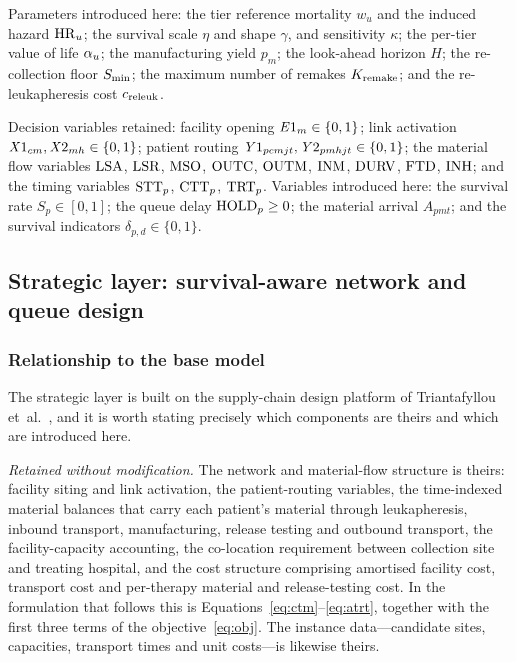 Parameters introduced here: the tier reference mortality $w_u$ and the induced
hazard $\mathrm{HR}_u$; the survival scale $\eta$ and shape $\gamma$, and sensitivity
$\kappa$; the per-tier value of life $\alpha_{u}$; the manufacturing yield
$p_m$; the look-ahead horizon $H$; the re-collection floor $S_{\min}$; the
maximum number of remakes $K_{\mathrm{remake}}$; and the re-leukapheresis cost $c_{\mathrm{releuk}}$.

Decision variables retained: facility opening $\mathit{E}1_m \in \{0,1\}$; link
activation $\mathit{X}1_{cm}, \mathit{X}2_{mh} \in \{0,1\}$; patient routing
$\mathit{Y}1_{pcmjt}, \mathit{Y}2_{pmhjt} \in \{0,1\}$; the material flow variables
$\mathrm{LSA}$, $\mathrm{LSR}$, $\mathrm{MSO}$, $\mathrm{OUTC}$, $\mathrm{OUTM}$, $\mathrm{INM}$, $\mathrm{DURV}$, $\mathrm{FTD}$, $\mathrm{INH}$; and
the timing variables $\mathrm{STT}_p$, $\mathrm{CTT}_p$, $\mathrm{TRT}_p$. Variables introduced here:
the survival rate $S_p \in [0,1]$; the queue delay $\mathrm{HOLD}_p \ge 0$; the
material arrival $A_{pmt}$; and the survival indicators $\delta_{p,d} \in
\{0,1\}$.

\subsection{Strategic layer: survival-aware network and queue design}
\label{sec:strategic}

\subsubsection{Relationship to the base model}
\label{sec:provenance}

The strategic layer is built on the supply-chain design platform of
Triantafyllou et~al.\ \cite{triantafyllou2022}, and it is worth stating
precisely which components are theirs and which are introduced here.

\emph{Retained without modification.} The network and material-flow structure
is theirs: facility siting and link activation, the patient-routing variables,
the time-indexed material balances that carry each patient's material through
leukapheresis, inbound transport, manufacturing, release testing and outbound
transport, the facility-capacity accounting, the co-location requirement
between collection site and treating hospital, and the cost structure
comprising amortised facility cost, transport cost and per-therapy material and
release-testing cost. In the formulation that follows this is
Equations~\eqref{eq:ctm}--\eqref{eq:atrt}, together with the first three terms
of the objective~\eqref{eq:obj}. The instance data---candidate sites,
capacities, transport times and unit costs---is likewise theirs.

